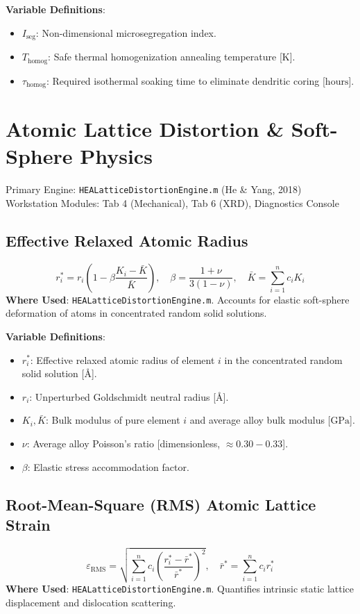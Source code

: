 \documentclass[11pt,a4paper]{article}
\begin{document}
\noindent\textbf{Variable Definitions}:
\begin{itemize}
  \item $I_{\text{seg}}$: Non-dimensional microsegregation index.
  \item $T_{\text{homog}}$: Safe thermal homogenization annealing temperature [$\text{K}$].
  \item $\tau_{\text{homog}}$: Required isothermal soaking time to eliminate dendritic coring [$\text{hours}$].
\end{itemize}

\section{Atomic Lattice Distortion \& Soft-Sphere Physics}
Primary Engine: \texttt{HEALatticeDistortionEngine.m} (He \& Yang, 2018) \\
Workstation Modules: Tab 4 (Mechanical), Tab 6 (XRD), Diagnostics Console

\subsection{Effective Relaxed Atomic Radius}
\begin{equation}
r_i^* = r_i \left(1 - \beta \frac{K_i - \bar{K}}{\bar{K}}\right), \quad \beta = \frac{1 + \nu}{3(1 - \nu)}, \quad \bar{K} = \sum_{i=1}^n c_i K_i
\end{equation}
\textbf{Where Used}: \texttt{HEALatticeDistortionEngine.m}. Accounts for elastic soft-sphere deformation of atoms in concentrated random solid solutions.

\noindent\textbf{Variable Definitions}:
\begin{itemize}
  \item $r_i^*$: Effective relaxed atomic radius of element $i$ in the concentrated random solid solution [$\text{\AA}$].
  \item $r_i$: Unperturbed Goldschmidt neutral radius [$\text{\AA}$].
  \item $K_i, \bar{K}$: Bulk modulus of pure element $i$ and average alloy bulk modulus [$\text{GPa}$].
  \item $\nu$: Average alloy Poisson's ratio [dimensionless, $\approx 0.30 - 0.33$].
  \item $\beta$: Elastic stress accommodation factor.
\end{itemize}

\subsection{Root-Mean-Square (RMS) Atomic Lattice Strain}
\begin{equation}
\varepsilon_{\text{RMS}} = \sqrt{\sum_{i=1}^n c_i \left(\frac{r_i^* - \bar{r}^*}{\bar{r}^*}\right)^2}, \quad \bar{r}^* = \sum_{i=1}^n c_i r_i^*
\end{equation}
\textbf{Where Used}: \texttt{HEALatticeDistortionEngine.m}. Quantifies intrinsic static lattice displacement and dislocation scattering.
\end{document}
